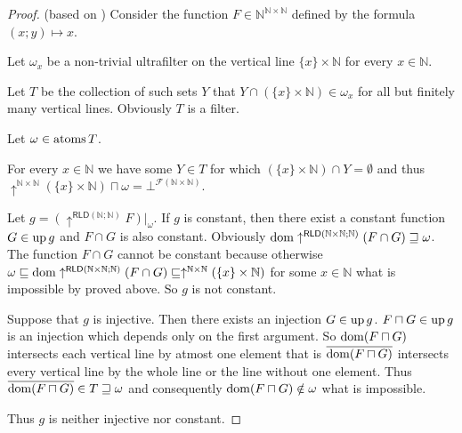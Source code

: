 \begin{proof}
(based on \cite{MO44055}) Consider the function $F\in\mathbb{N}^{\mathbb{N}\times\mathbb{N}}$
defined by the formula $(x;y)\mapsto x$.

Let $\omega_{x}$ be a non-trivial ultrafilter on the vertical line
$\{x\}\times\mathbb{N}$ for every $x\in\mathbb{N}$.

Let $T$ be the collection of such sets $Y$ that $Y\cap(\{x\}\times\mathbb{N})\in\omega_{x}$
for all but finitely many vertical lines. Obviously $T$ is a filter.

Let $\omega\in\operatorname{atoms} T$.

For every $x\in\mathbb{N}$ we have some $Y\in T$ for which $(\{x\}\times\mathbb{N})\cap Y=\emptyset$
and thus $\uparrow^{\mathbb{N}\times\mathbb{N}}(\{x\}\times\mathbb{N})\sqcap\omega=\bot^{\mathscr{F}(\mathbb{N}\times\mathbb{N})}$.

Let $g=(\uparrow^{\mathsf{RLD}(\mathbb{N};\mathbb{N})}F)|_{\omega}$.
If $g$ is constant, then there exist a constant function $G\in\operatorname{up} g$
and $F\cap G$ is also constant. Obviously $\operatorname{dom}\uparrow^{\mathsf{RLD}(\mathbb{N}\times\mathbb{N};\mathbb{N})}(F\cap G)\sqsupseteq\omega$.
The function $F\cap G$ cannot be constant because otherwise $\omega\sqsubseteq\operatorname{dom}\uparrow^{\mathsf{RLD}(\mathbb{N}\times\mathbb{N};\mathbb{N})}(F\cap G)\sqsubseteq\uparrow^{\mathbb{N}\times\mathbb{N}}(\{x\}\times\mathbb{N})$
for some $x\in\mathbb{N}$ what is impossible by proved above. So
$g$ is not constant.

Suppose that $g$ is injective. Then there exists an injection $G\in\operatorname{up} g$.
$F\sqcap G\in\operatorname{up} g$ is an injection which depends only on the first argument.
So $\operatorname{dom}(F\sqcap G)$ intersects each vertical line by atmost one element that
is $\overline{\operatorname{dom}(F\sqcap G)}$ intersects every vertical line by the whole
line or the line without one element. Thus $\overline{\operatorname{dom}(F\sqcap G)}\in T\sqsupseteq\omega$
and consequently $\operatorname{dom}(F\sqcap G)\notin\omega$ what is impossible.

Thus $g$ is neither injective nor constant.
\end{proof}

